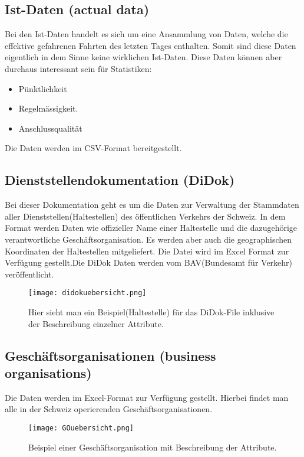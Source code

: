\subsection{Ist-Daten (actual data)}
\label{sec:istdaten}
Bei den Ist-Daten handelt es sich um eine Ansammlung von Daten, welche die effektive gefahrenen Fahrten des letzten Tages enthalten. Somit sind diese Daten eigentlich in dem Sinne keine wirklichen Ist-Daten. Diese Daten können aber durchaus interessant sein für Statistiken:\cite{istdaten}
\begin{itemize}
	\item{Pünktlichkeit}   
	\item{Regelmässigkeit}. 
	\item{Anschlussqualität}  
\end{itemize}
Die Daten werden im CSV-Format bereitgestellt.

\subsection{Dienststellendokumentation (DiDok)}
\label{sec:didok}
Bei dieser Dokumentation geht es um die Daten zur Verwaltung der Stammdaten aller Dienststellen(Haltestellen) des öffentlichen Verkehrs der Schweiz. In dem Format werden Daten wie offizieller Name einer Haltestelle und die dazugehörige verantwortliche Geschäftsorganisation. Es werden aber auch die geographischen Koordinaten der Haltestellen mitgeliefert. Die Datei wird im Excel Format zur Verfügung gestellt.Die DiDok Daten werden vom BAV(Bundesamt für Verkehr) veröffentlicht. \cite{didok}

\begin{figure}[]
	\centering
	\texttt{[image: didokuebersicht.png]}
	\caption{Hier sieht man ein Beispiel(Haltestelle) für das DiDok-File inklusive der Beschreibung einzelner Attribute.\cite{didok}}
	\label{fig:didok-uebersicht}
\end{figure}

\subsection{Geschäftsorganisationen (business organisations)}
\label{Geschaeftsorganisationen}
Die Daten werden im Excel-Format zur Verfügung gestellt. Hierbei findet man alle in der Schweiz operierenden Geschäftsorganisationen.
\begin{figure}[]
	\centering
	\texttt{[image: GOuebersicht.png]}
	\caption{Beispiel einer Geschäftsorganisation mit Beschreibung der Attribute. \cite{geschaeftsorganisation}}
	\label{fig:Uebersicht Geschaeftsorganisationen}
\end{figure}
